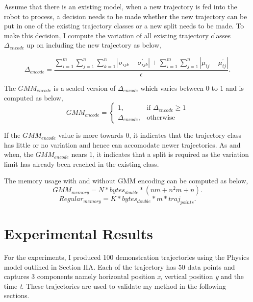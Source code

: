 \documentclass[conference]{IEEEtran}
\begin{document}
Assume that there is an existing model, when a new trajectory is fed into the robot to process, a decision needs to be made whether the new trajectory can be put in one of the existing trajectory classes or a new split needs to be made. To make this decision, I compute the variation of all existing trajectory classes $\Delta_{encode}$ up on including the new trajectory as below,

\begin{equation}
\Delta_{encode} = \frac{\sum_{i=1}^m \sum_{j=1}^n \sum_{k=1}^n |\sigma_{ijk} - \sigma_{ijk}^\prime| + \sum_{i=1}^m \sum_{j=1}^n |\mu_{ij} - \mu_{ij}^\prime|}{\epsilon}.
\end{equation}

The $GMM_{encode}$ is a scaled version of $\Delta_{encode}$ which varies between 0 to 1 and is computed as below,
\[
    \text{$GMM_{encode}$}= 
\begin{cases}
    1, & \text{if $\Delta_{encode}$} \geq 1\\
    \text{$\Delta_{encode}$}, & \text{otherwise}
\end{cases}
\]

If the $GMM_{encode}$ value is more towards 0, it indicates that the trajectory class has little or no variation and hence can accomodate newer trajectories. As and when, the $GMM_{encode}$ nears 1, it indicates that a split is required as the variation limit has already been reached in the existing class.

The memory usage with and without GMM encoding can be computed as below,
\begin{equation}
GMM_{memory} = N * bytes_{double} * ( nm + n^{2}m + n ).
\end{equation}
\begin{equation}
Regular_{memory} = K * bytes_{double} * m * traj_{points}.
\end{equation}

\section{Experimental Results}
For the experiments, I produced 100 demonstration trajectories using the Physics model outlined in Section IIA. Each of the trajectory has 50 data points and captures 3 components namely horizontal position \emph{x}, vertical position \emph{y} and the time \emph{t}. These trajectories are used to validate my method in the following sections.
\end{document}
